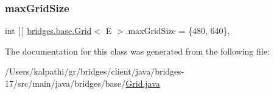 \mbox{\label{classbridges_1_1base_1_1_grid_a803fd4c070a22863c82581f0bb258c1c}} 
\subsubsection{\texorpdfstring{max\+Grid\+Size}{maxGridSize}}
{\footnotesize\ttfamily int \mbox{[}$\,$\mbox{]} \mbox{\hyperlink{classbridges_1_1base_1_1_grid}{bridges.\+base.\+Grid}}$<$ E $>$.max\+Grid\+Size = \{480, 640\}\hspace{0.3cm}{\ttfamily [static]}, {\ttfamily [protected]}}



The documentation for this class was generated from the following file\+:\begin{DoxyCompactItemize}
\item 
/\+Users/kalpathi/gr/bridges/client/java/bridges-\/17/src/main/java/bridges/base/\mbox{\hyperlink{_grid_8java}{Grid.\+java}}\end{DoxyCompactItemize}
